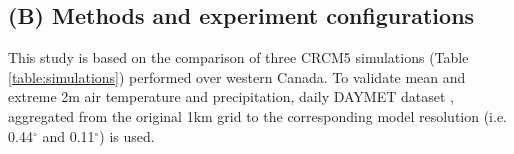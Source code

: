\documentclass[a0b,landscape]{a0poster}
\begin{document}
\begin{multicols*}{4}


\section*{(B) Methods and experiment configurations}
%
This study is based on the comparison of three CRCM5 simulations (Table
\ref{table:simulations}) performed over western Canada. To validate mean and
extreme 2m air temperature and precipitation, daily DAYMET dataset
\citet{thornton1997}, aggregated from the original 1km grid to the corresponding
model resolution (i.e. 0.44$^\circ$ and 0.11$^\circ$) is used.


\end{multicols*}
\end{document}
